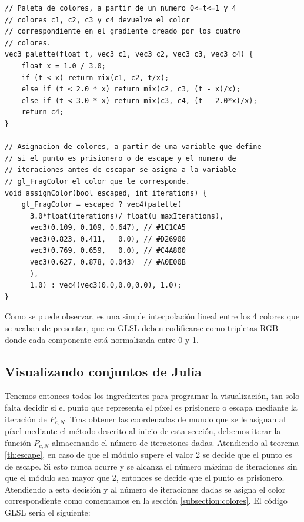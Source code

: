 \begin{lstlisting}
// Paleta de colores, a partir de un numero 0<=t<=1 y 4 
// colores c1, c2, c3 y c4 devuelve el color 
// correspondiente en el gradiente creado por los cuatro 
// colores.
vec3 palette(float t, vec3 c1, vec3 c2, vec3 c3, vec3 c4) {
    float x = 1.0 / 3.0;
    if (t < x) return mix(c1, c2, t/x);
    else if (t < 2.0 * x) return mix(c2, c3, (t - x)/x);
    else if (t < 3.0 * x) return mix(c3, c4, (t - 2.0*x)/x);
    return c4;
}

// Asignacion de colores, a partir de una variable que define
// si el punto es prisionero o de escape y el numero de 
// iteraciones antes de escapar se asigna a la variable 
// gl_FragColor el color que le corresponde.
void assignColor(bool escaped, int iterations) {
    gl_FragColor = escaped ? vec4(palette(
      3.0*float(iterations)/ float(u_maxIterations),
      vec3(0.109, 0.109, 0.647), // #1C1CA5
      vec3(0.823, 0.411,   0.0), // #D26900
      vec3(0.769, 0.659,   0.0), // #C4A800
      vec3(0.627, 0.878, 0.043)  // #A0E00B
      ), 
      1.0) : vec4(vec3(0.0,0.0,0.0), 1.0);
}
\end{lstlisting}

Como se puede observar, es una simple interpolación lineal entre los 4 colores que se acaban de presentar, que en GLSL deben codificarse como tripletas RGB donde cada componente está normalizada entre 0 y 1.

\subsection{Visualizando conjuntos de Julia}
\label{subsection:grafica-julia}

Tenemos entonces todos los ingredientes para programar la visualización, tan solo falta decidir si el punto que representa el píxel es prisionero o escapa mediante la iteración de $P_{c,N}$. Tras obtener las coordenadas de mundo que se le asignan al píxel mediante el método descrito al inicio de esta sección, debemos iterar la función $P_{c,N}$ almacenando el número de iteraciones dadas. Atendiendo al teorema \ref{th:escape}, en caso de que el módulo supere el valor 2 se decide que el punto es de escape. Si esto nunca ocurre y se alcanza el número máximo de iteraciones sin que el módulo sea mayor que 2, entonces se decide que el punto es prisionero. Atendiendo a esta decisión y al número de iteraciones dadas se asigna el color correspondiente como comentamos en la sección \ref{subsection:colores}. El código GLSL sería el siguiente:

